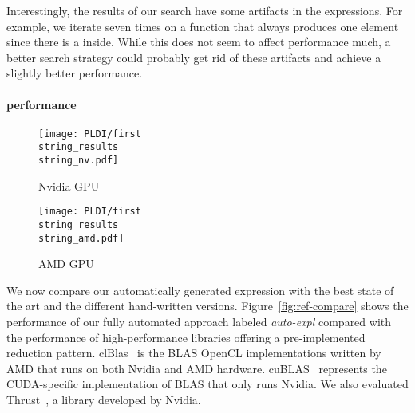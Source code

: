 Interestingly, the results of our search have some artifacts in the expressions.
For example, we iterate seven times on a function that always produces one element since there is a  inside.
While this does not seem to affect performance much, a better search strategy could probably get rid of these artifacts and achieve a slightly better performance.


\paragraph{performance}

\begin{figure*}[t]
  \centering
  \begin{subfigure}[b]{0.475\linewidth}
    \texttt{[image: PLDI/first\\string\_results\\string\_nv.pdf]}
    \caption{Nvidia GPU}
    \label{fig:ref-compare-nv}
  \end{subfigure}
  \begin{subfigure}[b]{0.475\linewidth}
    \texttt{[image: PLDI/first\\string\_results\\string\_amd.pdf]} 
    \caption{AMD GPU}
    \label{fig:ref-compare-amd}
  \end{subfigure}
  \vspace{-1.5em}
  \caption{Performance comparison of hand-written version versus automatically generated ones for two different devices.
  Our automatically explored version \emph{auto-expl} achieves performance on par with the best high performance libraries on both platforms.}
  \label{fig:ref-compare}
\end{figure*}


We now compare our automatically generated expression with the best state of the art and the different hand-written versions.
Figure~\ref{fig:ref-compare} shows the performance of our fully automated approach labeled \emph{auto-expl} compared with the performance of high-performance libraries offering a pre-implemented reduction pattern.
clBlas~\cite{clBLAS} is the BLAS OpenCL implementations written by AMD that runs on both Nvidia and AMD hardware.
cuBLAS~\cite{cuBLAS} represents the CUDA-specific implementation of BLAS that only runs Nvidia.
We also evaluated Thrust~\cite{BellHo2011}, a library developed by Nvidia.%

